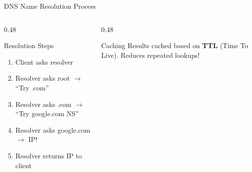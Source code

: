 \documentclass[aspectratio=169]{beamer}  %
\begin{document}
\begin{frame}{DNS Name Resolution Process}
\begin{center}
    \end{center}
    
    \vspace{0.2em}
    \begin{columns}[T]
        \begin{column}{0.48\textwidth}
            \begin{block}{Resolution Steps}
                \footnotesize
                \begin{enumerate}\setlength{\itemsep}{0pt}
                    \item Client asks resolver
                    \item Resolver asks root $\rightarrow$ ``Try .com''
                    \item Resolver asks .com $\rightarrow$ ``Try google.com NS''
                    \item Resolver asks google.com $\rightarrow$ IP!
                    \item Resolver returns IP to client
                \end{enumerate}
            \end{block}
        \end{column}
        \begin{column}{0.48\textwidth}
            \begin{exampleblock}{Caching}
                \small
                Results cached based on \textbf{TTL} (Time To Live). Reduces repeated lookups!
            \end{exampleblock}
        \end{column}
    \end{columns}
\end{frame}
\end{document}

